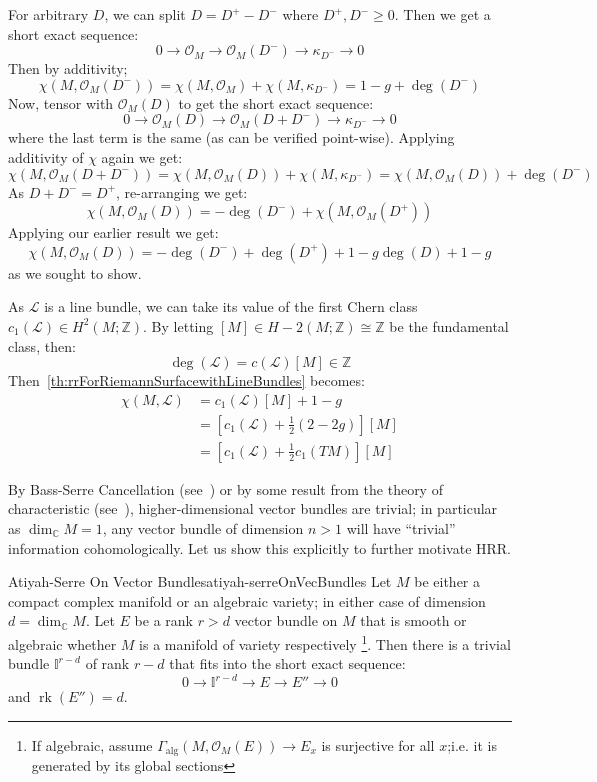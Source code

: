 \documentclass{book}
\newenvironment{Proof}[1][]
  {\begin{ProofTcb}[#1]}
  {\end{ProofTcb}}
\newcommand{\Z}{{\mathbb{Z}}}
\newcommand{\BI}{{\mathbb{I}}}
\newcommand{\C}{{\mathbb{C}}}
\newcommand{\CL}{{\mathcal{L}}}
\newcommand{\CO}{{\mathcal{O}}}
\newcommand{\rk}{{\operatorname{rk}}}
\renewcommand{\deg}{{\operatorname{deg}}}
\begin{document}
\begin{Proof}
  For arbitrary $D$, we can split $D = D^+ - D^-$ where $D^+, D^- \ge 0$. Then we get a short exact sequence:
  \[
    0 \to \CO_M \to \CO_M(D^-) \to \kappa_{D^-} \to 0
  \]
  Then by additivity;
  \[
    \chi(M, \CO_M(D^-)) = \chi(M, \CO_M) +\chi(M, \kappa_{D^-}) = 1-g + \deg(D^-)
  \]
  Now, tensor with $\CO_M(D)$ to get the short exact sequence:
  \[
    0 \to \CO_M(D) \to \CO_M(D+D^-) \to \kappa_{D^-} \to 0
  \]
  where the last term is the same (as can be verified point-wise). Applying additivity of $\chi$ again we get:
  \[
    \chi(M, \CO_M(D+D^-)) = \chi(M, \CO_M(D)) + \chi(M, \kappa_{D^-}) = \chi(M, \CO_M(D)) + \deg(D^-)
  \]
  As $D + D^- = D^+$, re-arranging we get:
  \[
     \chi(M, \CO_M(D)) =  - \deg(D^-) + \chi(M, \CO_M(D^+))
  \]
  Applying our earlier result we get:
  \[
     \chi(M, \CO_M(D)) =  - \deg(D^-) + \deg(D^+) + 1-g  \deg(D) + 1-g
  \]
  as we sought to show.
\end{Proof}

As $\CL$ is a line bundle, we can take its value of the first Chern class $c_1(\CL) \in H^2(M; \Z)$. By
letting $[M] \in H-2(M; \Z) \cong \Z$ be the fundamental class, then:
\[
  \deg(\CL) = c(\CL)[M] \in \Z
\]
Then~\cref{th:rrForRiemannSurfacewithLineBundles} becomes:
\begin{align*}
  \chi(M, \CL) &= c_1(\CL)[M] + 1-g\\
               &= \left[c_1(\CL) + \frac{1}{2}(2-2g)\right][M]\\
               &= \left[c_1(\CL) + \frac{1}{2}c_1(TM)\right][M]
\end{align*}

By Bass-Serre Cancellation (see~\cite[section~5.1]{NateKTheory}) or by some result from the theory of
characteristic (see~\cite[section~3.2]{NateKTheory}), higher-dimensional vector bundles are trivial; in
particular as $\dim_\C M = 1$, any vector bundle of dimension $n > 1$ will have ``trivial'' information
cohomologically. Let us show this explicitly to further motivate HRR.


\begin{thm}{Atiyah-Serre On Vector Bundles}{atiyah-serreOnVecBundles}
  Let $M$ be either a compact complex manifold or an algebraic variety; in either case of dimension $d
  =\dim_\C M$. Let $E$ be a rank $r> d$ vector bundle on $M$ that is smooth or algebraic whether $M$ is a
  manifold of variety respectively \footnote{If algebraic, assume
    $\Gamma_{\operatorname{alg}}(M, \CO_M(E)) \to E_x$ is
  surjective for all $x$;i.e. it is generated by its global sections}. Then there is a trivial bundle
  $\BI^{r-d}$ of rank $r-d$  that fits into the short exact sequence:
  \[
    0 \to \BI^{r-d} \to E \to E'' \to 0
  \]
  and $\rk(E'') = d$.
\end{thm}
\end{document}
